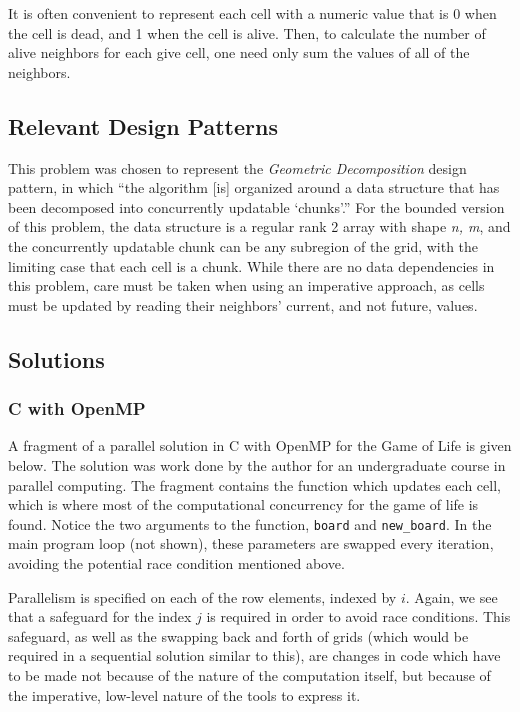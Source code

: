 It is often convenient to represent each cell with a numeric value 
that is 0 when the cell is dead, and 1 when the cell is alive. 
Then, to calculate the number of alive neighbors for each give cell, 
one need only sum the values of all of the neighbors.

\subsection{Relevant Design Patterns}
This problem was chosen to represent the \textit{Geometric Decomposition} design pattern, \cite{mass}
in which ``the algorithm [is] organized around a data structure that has been decomposed into concurrently updatable `chunks'.''
For the bounded version of this problem, 
the data structure is a regular rank 2 array with shape \textit{n, m}, 
and the concurrently updatable chunk can be any subregion of the grid, 
with the limiting case that each cell is a chunk. 
While there are no data dependencies in this problem, 
care must be taken when using an imperative approach, 
as cells must be updated by reading their neighbors' current, and not future, values.

\subsection{Solutions}
\subsubsection{C with OpenMP}
A fragment of a parallel solution in C with OpenMP for the Game of Life is given below. 
The solution was work done by the author for an undergraduate course in parallel computing.
The fragment contains the function which updates each cell, 
which is where most of the computational concurrency for the game of life is found. 
Notice the two arguments to the function, \texttt{board} and \texttt{new\_board}.
In the main program loop (not shown), these parameters are swapped every iteration, 
avoiding the potential race condition mentioned above.

\begin{singlespacing}
\begin{small}

\end{small}
\end{singlespacing}

Parallelism is specified on each of the row elements, indexed by $i$.
Again, we see that a safeguard for the index $j$ is required in order to avoid race conditions. 
This safeguard, as well as the swapping back and forth of grids (which would be required in a sequential solution similar to this), 
are changes in code which have to be made not because of the nature of the computation itself, 
but because of the imperative, low-level nature of the tools to express it.

